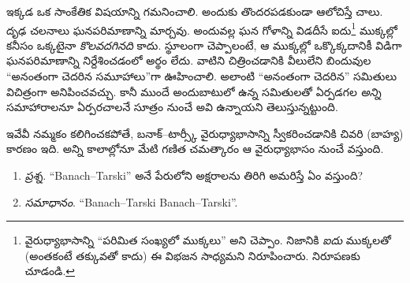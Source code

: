 \documentclass[../../../include/open-logic-section]{subfiles}
\begin{document}
ఇక్కడ ఒక సాంకేతిక విషయాన్ని గమనించాలి. అందుకు తొందరపడకుండా ఆలోచిస్తే చాలు. దృఢ చలనాలు ఘనపరిమాణాన్ని మార్చవు. అందువల్ల ఘన గోళాన్ని విడదీసే ఐదు\footnote{వైరుధ్యాభాసాన్ని ``పరిమిత సంఖ్యలో ముక్కలు'' అని చెప్పాం. నిజానికి \citet{Robinson1947} \emph{ఐదు} ముక్కలతో (అంతకంటే తక్కువతో కాదు) ఈ విభజన సాధ్యమని నిరూపించారు. నిరూపణకు \citet[pp.~66--7]{Wagon2016} చూడండి.} ముక్కల్లో కనీసం ఒక్కటైనా \emph{కొలవదగినది} కాదు. స్థూలంగా చెప్పాలంటే, ఆ ముక్కల్లో ఒక్కొక్కదానికీ విడిగా ఘనపరిమాణాన్ని నిర్దేశించడంలో అర్థం లేదు. వాటిని చిత్రించడానికి వీలులేని బిందువుల ``అనంతంగా చెదరిన సమూహాలు''గా ఊహించాలి. అలాంటి ``అనంతంగా చెదరిన'' సమితులు విచిత్రంగా అనిపించవచ్చు. కానీ ముందే అందుబాటులో ఉన్న సమితులతో ఏర్పడగల
\emph{అన్ని} సమాహారాలనూ ఏర్పరచాలనే \stagesacc{} సూత్రం
నుంచే అవి ఉన్నాయని తెలుస్తున్నట్టుంది.

ఇవేవీ నమ్మకం కలిగించకపోతే, బనాక్--టార్స్కీ వైరుధ్యాభాసాన్ని స్వీకరించడానికి చివరి (బాహ్య) కారణం ఇది. అన్ని కాలాల్లోనూ మేటి గణిత చమత్కారం ఆ వైరుధ్యాభాసం నుంచే వస్తుంది.
\begin{enumerate}
	\item[] \emph{ప్రశ్న}. ``Banach--Tarski'' అనే పేరులోని అక్షరాలను తిరిగి అమరిస్తే ఏం వస్తుంది?
	\item[] \emph{సమాధానం}. ``Banach--Tarski Banach--Tarski''.
\end{enumerate}
\end{document}
